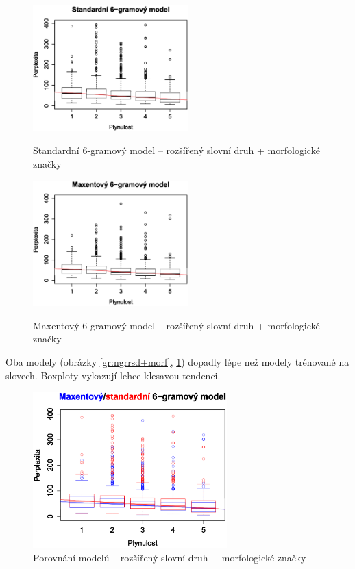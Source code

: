 \documentclass[12pt,a4paper]{report}
\begin{document}
\begin{figure}[!htb]
\begin{center}
  \centering\includegraphics[width=60mm]{./grafy/morf/ngram/all.svg.eps}	
  \caption[Standardní 6-gramový model -- rozšířený slovní druh + morf. zn.]{Standardní 6-gramový model -- rozšířený slovní druh + morfologické značky}\label{gr:ngrrsd+morf}
\endminipage\quad
{}
  \centering\includegraphics[width=60mm]{./grafy/morf/maxent/all.svg.eps}	
  \caption[Maxentový 6-gramový model -- rozšířený slovní druh + morf. zn.]{Maxentový 6-gramový model -- rozšířený slovní druh + morfologické značky}\label{gr:maxrsd+morf}
\endminipage
\end{center}
\end{figure}

Oba modely (obrázky \ref{gr:ngrrsd+morf}, \ref{gr:maxrsd+morf}) dopadly lépe než modely trénované na slovech. Boxploty vykazují lehce klesavou tendenci.


\begin{figure}[!htbp]
\begin{center}
	\centering
	\includegraphics[width=75mm]{./grafy/morf/porovnani/all.svg.eps}	
	\caption{Porovnání modelů -- rozšířený slovní druh + morfologické značky}\label{gr:porrsd+morf}
\endminipage
\end{center}
\end{figure}
\end{document}
